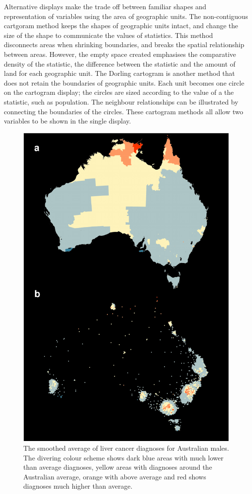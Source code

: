 \documentclass[conference,final,]{IEEEtran}
\makeatletter
\def\maxwidth{\ifdim\Gin@nat@width>\linewidth\linewidth
\else\Gin@nat@width\fi}
\let\Oldincludegraphics\includegraphics
\renewcommand{\includegraphics}[1]{\Oldincludegraphics[width=\maxwidth]{#1}}
\makeatother
\begin{document}
Alternative displays make the trade off between familiar shapes and
representation of variables using the area of geographic units. The
non-contiguous cartgoram method keeps the shapes of geographic units
intact, and change the size of the shape to communicate the values of
statistics. This method disconnects areas when shrinking boundaries, and
breaks the spatial relationship between areas. However, the empty space
created emphasises the comparative density of the statistic, the
difference between the statistic and the amount of land for each
geographic unit. The Dorling cartogram is another method that does not
retain the boundaries of geographic units. Each unit becomes one circle
on the cartogram display; the circles are sized according to the value
of a the statistic, such as population. The neighbour relationships can
be illustrated by connecting the boundaries of the circles. These
cartogram methods all allow two variables to be shown in the single
display.

\begin{figure}
\centering
\includegraphics{paper_files/figure-latex/liver-1.pdf}
\caption{The smoothed average of liver cancer diagnoses for Australian
males. The divering colour scheme shows dark blue areas with much lower
than average diagnoses, yellow areas with diagnoses around the
Australian average, orange with above average and red shows diagnoses
much higher than average.}
\end{figure}
\end{document}
